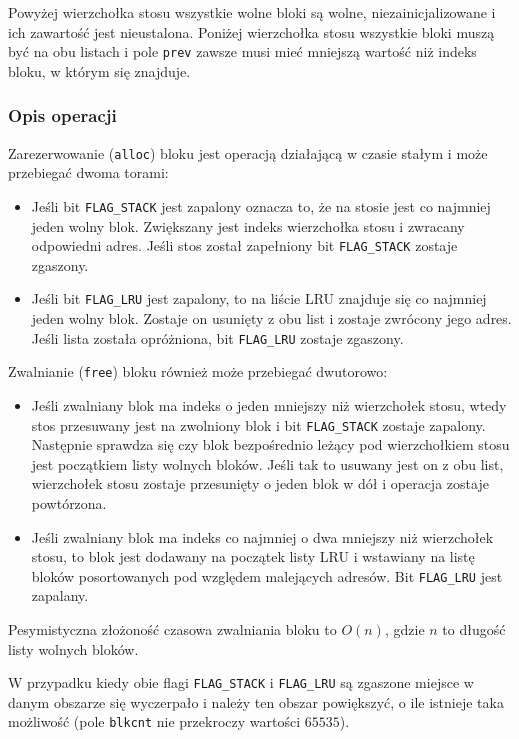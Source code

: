 \documentclass[12pt,a4paper,titlepage,twoside]{mwart}
\begin{document}
Powyżej wierzchołka stosu wszystkie wolne bloki są wolne, niezainicjalizowane i
ich zawartość jest nieustalona. Poniżej wierzchołka stosu wszystkie bloki muszą
być na obu listach i pole \verb+prev+ zawsze musi mieć mniejszą wartość niż
indeks bloku, w którym się znajduje.

\subsubsection{Opis operacji}

Zarezerwowanie (\verb+alloc+) bloku jest operacją działającą w czasie stałym i
może przebiegać dwoma torami:
\begin{itemize}
\item Jeśli bit \verb+FLAG_STACK+ jest zapalony oznacza to, że na stosie jest
co najmniej jeden wolny blok. Zwiększany jest indeks wierzchołka stosu i
zwracany odpowiedni adres. Jeśli stos został zapełniony bit \verb+FLAG_STACK+
zostaje zgaszony.
\item Jeśli bit \verb+FLAG_LRU+ jest zapalony, to na liście LRU znajduje się
co najmniej jeden wolny blok. Zostaje on usunięty z obu list i zostaje zwrócony
jego adres. Jeśli lista została opróżniona, bit \verb+FLAG_LRU+ zostaje
zgaszony.
\end{itemize}

Zwalnianie (\verb+free+) bloku również może przebiegać dwutorowo:
\begin{itemize}
\item Jeśli zwalniany blok ma indeks o jeden mniejszy niż wierzchołek stosu,
wtedy stos przesuwany jest na zwolniony blok i bit \verb+FLAG_STACK+ zostaje
zapalony. Następnie sprawdza się czy blok bezpośrednio leżący pod wierzchołkiem
stosu jest początkiem listy wolnych bloków. Jeśli tak to usuwany jest on z obu
list, wierzchołek stosu zostaje przesunięty o jeden blok w dół i operacja
zostaje powtórzona.
\item Jeśli zwalniany blok ma indeks co najmniej o dwa mniejszy niż wierzchołek
stosu, to blok jest dodawany na początek listy LRU i wstawiany na listę bloków
posortowanych pod względem malejących adresów. Bit \verb+FLAG_LRU+ jest
zapalany.
\end{itemize}

Pesymistyczna złożoność czasowa zwalniania bloku to $O(n)$, gdzie $n$ to
długość listy wolnych bloków.

W przypadku kiedy obie flagi \verb+FLAG_STACK+ i \verb+FLAG_LRU+ są zgaszone
miejsce w danym obszarze się wyczerpało i należy ten obszar powiększyć, o ile
istnieje taka możliwość (pole \verb+blkcnt+ nie przekroczy wartości $65535$).
\end{document}
